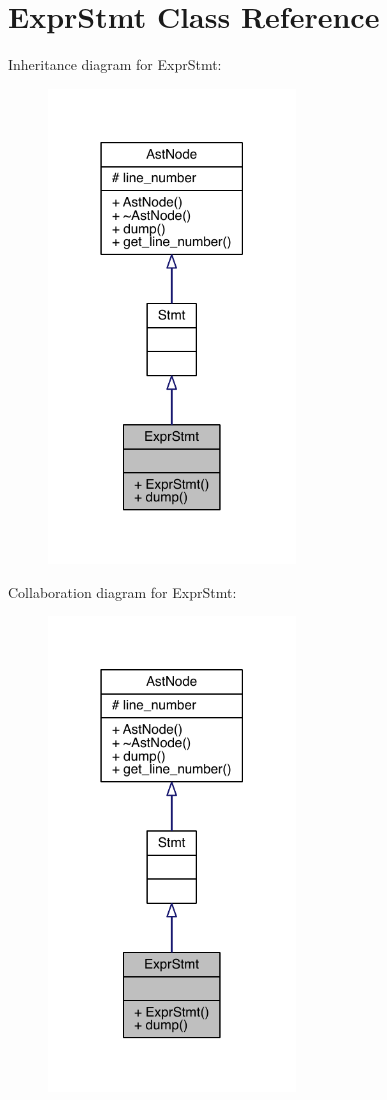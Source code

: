 \hypertarget{class_expr_stmt}{}\section{Expr\+Stmt Class Reference}
\label{class_expr_stmt}


Inheritance diagram for Expr\+Stmt\+:\nopagebreak
\begin{figure}[H]
\begin{center}
\leavevmode
\includegraphics[width=186pt]{class_expr_stmt__inherit__graph}
\end{center}
\end{figure}


Collaboration diagram for Expr\+Stmt\+:\nopagebreak
\begin{figure}[H]
\begin{center}
\leavevmode
\includegraphics[width=186pt]{class_expr_stmt__coll__graph}
\end{center}
\end{figure}
